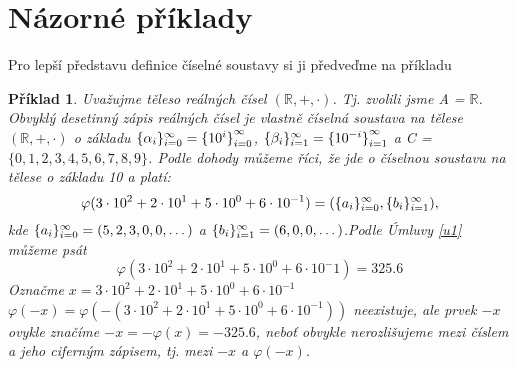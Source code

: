 \documentclass[12pt]{book}
\newtheorem*{pr}{Příklad}
\begin{document}
\section{Názorné příklady}
Pro lepší představu definice číselné soustavy si ji předveďme na příkladu
\begin{pr}
	Uvažujme těleso reálných čísel $(\mathbb{R},+,\cdot)$. Tj. zvolili jsme A = $\mathbb{R}$. Obvyklý desetinný zápis reálných čísel je vlastně číselná soustava na tělese $(\mathbb{R},+,\cdot)$ o základu $\{\alpha_i\}_{i=0}^{\infty}=\{{10^i\}}_{i=0}^{\infty}$, $\{\beta_i\}_{i=1}^{\infty}=\{{10^{-i}\}}_{i=1}^{\infty}$ a C = $\{0,1,2,3,4,5,6,7,8,9\}$. Podle dohody můžeme říci, že jde o číselnou soustavu na tělese o základu 10 a platí:
	$$\varphi(3\cdot10^2+2\cdot10^1+5\cdot10^0+6\cdot10^{-1})=(\{a_i\}_{i=0}^{\infty},\{b_i\}_{i=1}^{\infty}),$$kde
	$\{a_i\}_{i=0}^{\infty}=(5,2,3,0,0,\dots)$ a $\{b_i\}_{i=1}^{\infty} = (6,0,0,\dots)$.\newline Podle Úmluvy \ref{u1} můžeme psát $$\varphi(3\cdot10^2+2\cdot10^1+5\cdot10^0+6\cdot10^-1)=325.6$$
	Označme $x=3\cdot10^2+2\cdot10^1+5\cdot10^0+6\cdot10^{-1}$\newline
	$\varphi(-x) = \varphi(-(3\cdot10^2+2\cdot10^1+5\cdot10^0+6\cdot10^{-1}))$ neexistuje, ale prvek $-x$ ovykle značíme $-x=-\varphi(x)=-325.6$, neboť obvykle nerozlišujeme mezi číslem a jeho ciferným zápisem, tj. mezi $-x$ a $\varphi(-x)$.
	
	
\end{pr}
\end{document}
